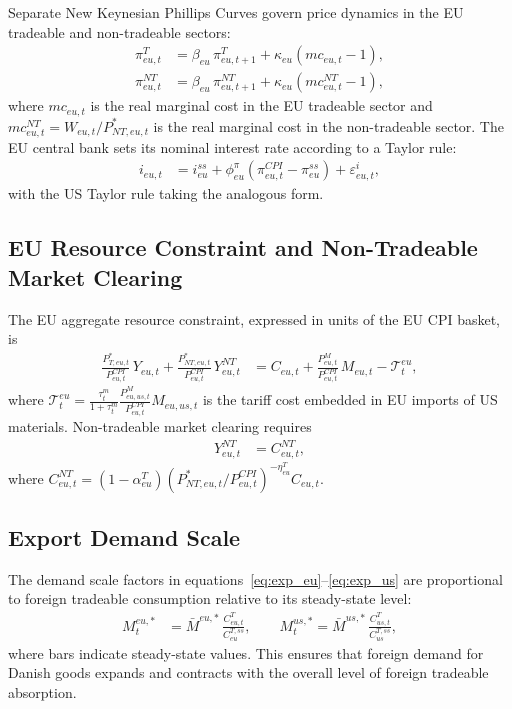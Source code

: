 \documentclass[12pt,a4paper]{article}
\begin{document}
Separate New Keynesian Phillips Curves govern price dynamics in the EU tradeable and non-tradeable sectors:
\begin{align}
    \pi^T_{eu,t} &= \beta_{eu}\,\pi^T_{eu,t+1} + \kappa_{eu}(mc_{eu,t} - 1),
    \label{eq:NKPC_T_eu}\\
    \pi^{NT}_{eu,t} &= \beta_{eu}\,\pi^{NT}_{eu,t+1} + \kappa_{eu}(mc^{NT}_{eu,t} - 1),
    \label{eq:NKPC_NT_eu}
\end{align}
where $mc_{eu,t}$ is the real marginal cost in the EU tradeable sector and $mc^{NT}_{eu,t} = W_{eu,t}/P^*_{NT,eu,t}$ is the real marginal cost in the non-tradeable sector. The EU central bank sets its nominal interest rate according to a Taylor rule:
\begin{align}
    i_{eu,t} &= i^{ss}_{eu} + \phi^\pi_{eu}\!\left(\pi^{CPI}_{eu,t} - \pi^{ss}_{eu}\right) + \varepsilon^i_{eu,t},
    \label{eq:TR_eu}
\end{align}
with the US Taylor rule taking the analogous form.

\subsection{EU Resource Constraint and Non-Tradeable Market Clearing}

The EU aggregate resource constraint, expressed in units of the EU CPI basket, is
\begin{align}
    \frac{P^*_{T,eu,t}}{P^{CPI}_{eu,t}}\,Y_{eu,t}
    + \frac{P^*_{NT,eu,t}}{P^{CPI}_{eu,t}}\,Y^{NT}_{eu,t}
    &= C_{eu,t} + \frac{P^M_{eu,t}}{P^{CPI}_{eu,t}}\,M_{eu,t} - \mathcal{T}^{eu}_t,
    \label{eq:RC_eu}
\end{align}
where $\mathcal{T}^{eu}_t = \frac{\tau^m_t}{1+\tau^m_t}\frac{P^M_{eu,us,t}}{P^{CPI}_{eu,t}}M_{eu,us,t}$ is the tariff cost embedded in EU imports of US materials. Non-tradeable market clearing requires
\begin{align}
    Y^{NT}_{eu,t} &= C^{NT}_{eu,t},
    \label{eq:NT_eu}
\end{align}
where $C^{NT}_{eu,t} = (1-\alpha^T_{eu})(P^*_{NT,eu,t}/P^{CPI}_{eu,t})^{-\eta^T_{eu}}C_{eu,t}$.

\subsection{Export Demand Scale}

The demand scale factors in equations~\eqref{eq:exp_eu}--\eqref{eq:exp_us} are proportional to foreign tradeable consumption relative to its steady-state level:
\begin{align}
    M^{eu,*}_t &= \bar{M}^{eu,*}\,\frac{C^T_{eu,t}}{C^{T,ss}_{eu}},
    \qquad
    M^{us,*}_t = \bar{M}^{us,*}\,\frac{C^T_{us,t}}{C^{T,ss}_{us}},
    \label{eq:Mstar}
\end{align}
where bars indicate steady-state values. This ensures that foreign demand for Danish goods expands and contracts with the overall level of foreign tradeable absorption.
\end{document}
